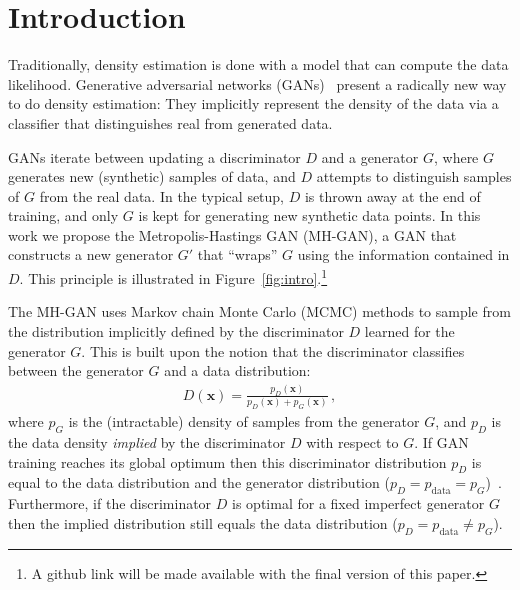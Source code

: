\documentclass{article}
\renewcommand{\vec}[1]{{\boldsymbol{\mathbf{#1}}}} %
\newcommand{\PG}{{p_G}}
\newcommand{\PD}{{p_D}}
\newcommand{\PR}{{p_{\textrm{data}}}}
\begin{document}
\section{Introduction}

Traditionally, density estimation is done with a model that can compute the data likelihood.
Generative adversarial networks (GANs)~\citep{Goodfellow2014} present a radically new way to do density estimation:
They implicitly represent the density of the data via a classifier that distinguishes real from generated data.

GANs iterate between updating a discriminator $D$ and a generator $G$, where $G$ generates new (synthetic) samples of data, and $D$ attempts to distinguish samples of $G$ from the real data.
In the typical setup, $D$ is thrown away at the end of training, and only $G$ is kept for generating new synthetic data points.
In this work we propose the Metropolis-Hastings GAN (MH-GAN), a GAN that constructs a new generator $G'$ that ``wraps'' $G$ using the information contained in $D$.
This principle is illustrated in Figure~\ref{fig:intro}.\footnote{A github link will be made available with the final version of this paper.}

The MH-GAN uses Markov chain Monte Carlo (MCMC) methods to sample from the distribution implicitly defined by the discriminator $D$ learned for the generator $G$.
This is built upon the notion that the discriminator classifies between the generator $G$ and a data distribution:
\begin{align}
  D(\vec x) = \frac{\PD(\vec x)}{\PD(\vec x) + \PG(\vec x)} \,, \label{eq:define PD}
\end{align}
where $\PG$ is the (intractable) density of samples from the generator $G$, and $\PD$ is the data density \emph{implied} by the discriminator $D$ with respect to $G$.
If GAN training reaches its global optimum then this discriminator distribution $\PD$ is equal to the data distribution and the generator distribution ($\PD = \PR = \PG$)~\citep{Goodfellow2014}.
Furthermore, if the discriminator $D$ is optimal for a fixed imperfect generator $G$ then the implied distribution still equals the data distribution ($\PD = \PR \neq \PG$)\@.


\end{document}
